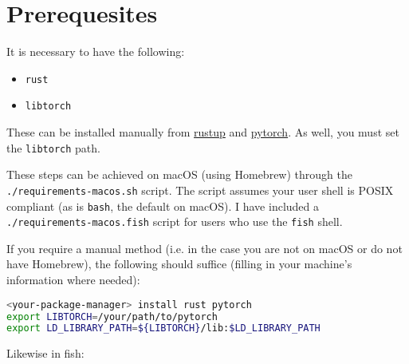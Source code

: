 

%
%

\newcommand{\hmwkTitle}{Final Project Documentation}
\newcommand{\hmwkDueDate}{December 16, 2024}
\newcommand{\hmwkDueTime}{11:59 PM}
\newcommand{\hmwkClass}{ENAE 380}
\newcommand{\hmwkClassTime}{0106}
\newcommand{\hmwkClassInstructor}{Dr. Mumu Xu}
\newcommand{\hmwkAuthorName}{\textbf{Vai Srivastava}}
\newcommand{\hmwkCompletionDate}{\today}



\maketitle

\pagebreak

\section{Prerequesites}
It is necessary to have the following:
\begin{itemize}
    \item \lstinline{rust}
    \item \lstinline{libtorch}
\end{itemize}

These can be installed manually from \href{https://rustup.rs}{rustup} and \href{https://pytorch.org/get-started/locally/}{pytorch}. As well, you must set the \lstinline{libtorch} path.

These steps can be achieved on macOS (using Homebrew) through the \lstinline{./requirements-macos.sh} script. The script assumes your user shell is POSIX compliant (as is \lstinline{bash}, the default on macOS). I have included a \lstinline{./requirements-macos.fish} script for users who use the \lstinline{fish} shell.

If you require a manual method (i.e. in the case you are not on macOS or do not have Homebrew), the following should suffice (filling in your machine's information where needed):

\begin{lstlisting}[language=bash]
<your-package-manager> install rust pytorch
export LIBTORCH=/your/path/to/pytorch
export LD_LIBRARY_PATH=${LIBTORCH}/lib:$LD_LIBRARY_PATH
\end{lstlisting}

Likewise in fish:

